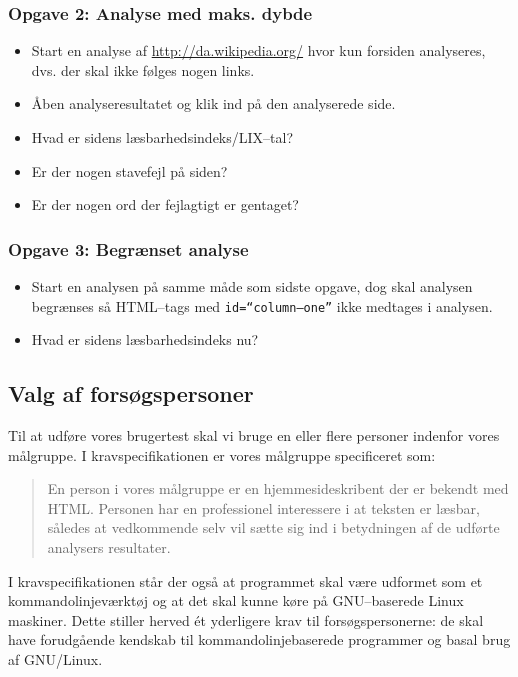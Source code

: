 \documentclass[a4paper,oneside]{memoir}
\begin{document}
\subsubsection{Opgave 2: Analyse med maks. dybde}
\begin{itemize}
\item Start en analyse af \url{http://da.wikipedia.org/} hvor kun
  forsiden analyseres, dvs. der skal ikke følges nogen links.
\item Åben analyseresultatet og klik ind på den analyserede side.
\item Hvad er sidens læsbarhedsindeks/LIX--tal?
\item Er der nogen stavefejl på siden?
\item Er der nogen ord der fejlagtigt er gentaget?
\end{itemize}

\subsubsection{Opgave 3: Begrænset analyse}
\begin{itemize}
\item Start en analysen på samme måde som sidste opgave, dog skal
  analysen begrænses så HTML--tags med \texttt{id=``column--one''} ikke
  medtages i analysen.
\item Hvad er sidens læsbarhedsindeks nu?
\end{itemize}

\subsection{Valg af forsøgspersoner}
Til at udføre vores brugertest skal vi bruge en eller flere personer
indenfor vores målgruppe. I kravspecifikationen er vores målgruppe
specificeret som:
\begin{quote}
En person i vores målgruppe er en hjemmesideskribent der er bekendt
med HTML. Personen har en professionel interessere i at teksten er
læsbar, således at vedkommende selv vil sætte sig ind i betydningen af
de udførte analysers resultater.
\end{quote}

I kravspecifikationen står der også at programmet skal være udformet
som et kommandolinjeværktøj og at det skal kunne køre på GNU--baserede
Linux maskiner. Dette stiller herved ét yderligere krav til
forsøgspersonerne: de skal have forudgående kendskab til
kommando\-linje\-baserede programmer og basal brug af GNU/Linux.
\end{document}

